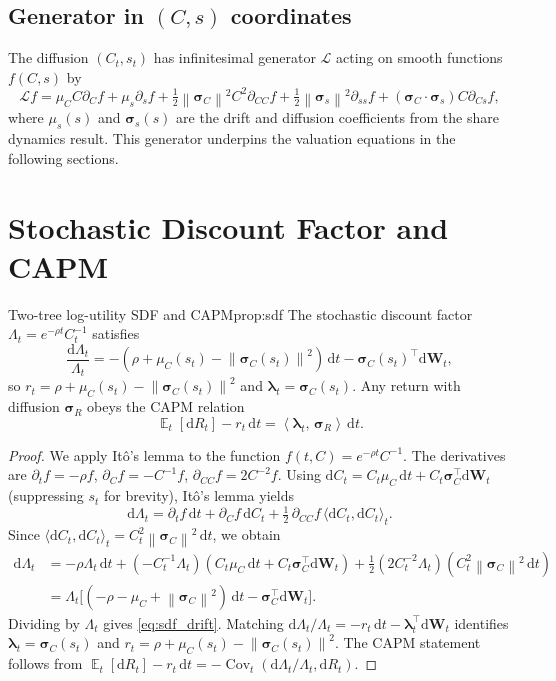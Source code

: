 ﻿\documentclass[11pt,letterpaper,oneside]{article}
\numberwithin{equation}{section}
\DeclareMathOperator{\E}{\mathbb{E}}
\DeclareMathOperator{\Cov}{\mathrm{Cov}}
\newcommand{\1}{\mathbf{1}}
\newcommand{\diff}{\mathrm{d}}
\newcommand{\norm}[1]{\left\lVert #1\right\rVert}
\newcommand{\ip}[2]{\left\langle #1,\,#2\right\rangle}
\begin{document}
\subsection{Generator in $(C,s)$ coordinates}
The diffusion $(C_t,s_t)$ has infinitesimal generator $\mathcal{L}$ acting on smooth functions $f(C,s)$ by
\[
  \mathcal{L}f = \mu_C C \partial_C f + \mu_s \partial_s f + \tfrac12 \norm{\bm{\sigma}_C}^2 C^2 \partial_{CC} f + \tfrac12 \norm{\bm{\sigma}_s}^2 \partial_{ss} f + (\bm{\sigma}_C\cdot\bm{\sigma}_s) C \partial_{Cs} f,
\]
where $\mu_s(s)$ and $\bm{\sigma}_s(s)$ are the drift and diffusion coefficients from the share dynamics result. This generator underpins the valuation equations in the following sections.

\section{Stochastic Discount Factor and CAPM}\label{sec:sdf}

\begin{proposition}{Two-tree log-utility SDF and CAPM}{prop:sdf}
The stochastic discount factor $\Lambda_t=e^{-\rho t}C_t^{-1}$ satisfies
\begin{equation}\label{eq:sdf_drift}
  \frac{\diff \Lambda_t}{\Lambda_t}=-(\rho+\mu_C(s_t)-\norm{\bm{\sigma}_C(s_t)}^2)\,\diff t-\bm{\sigma}_C(s_t)^{\top}\diff \bm{W}_t,
\end{equation}
so $r_t=\rho+\mu_C(s_t)-\norm{\bm{\sigma}_C(s_t)}^2$ and $\bm{\lambda}_t=\bm{\sigma}_C(s_t)$. Any return with diffusion $\bm{\sigma}_R$ obeys the CAPM relation
\begin{equation}\label{eq:capm}
  \E_t[\diff R_t]-r_t\,\diff t=\ip{\bm{\lambda}_t}{\bm{\sigma}_R}\,\diff t.
\end{equation}
\end{proposition}
\begin{proof}
We apply It\^o's lemma to the function $f(t, C) = e^{-\rho t} C^{-1}$. The derivatives are $\partial_t f = -\rho f$, $\partial_C f = -C^{-1} f$, $\partial_{CC} f = 2C^{-2} f$. Using $\diff C_t = C_t\mu_C\,\diff t + C_t\bm{\sigma}_C^{\top}\diff\bm{W}_t$ (suppressing $s_t$ for brevity), It\^o's lemma yields
\[
  \diff\Lambda_t = \partial_t f\,\diff t + \partial_C f\,\diff C_t + \tfrac12\,\partial_{CC} f\,\langle\diff C_t,\diff C_t\rangle_t.
\]
Since $\langle\diff C_t,\diff C_t\rangle_t = C_t^2\norm{\bm{\sigma}_C}^2\,\diff t$, we obtain
\begin{align*}
  \diff\Lambda_t
  &= -\rho\Lambda_t\,\diff t + (-C_t^{-1}\Lambda_t)(C_t\mu_C\,\diff t + C_t\bm{\sigma}_C^{\top}\diff\bm{W}_t) + \tfrac12(2 C_t^{-2}\Lambda_t)(C_t^2\norm{\bm{\sigma}_C}^2\,\diff t) \\
  &= \Lambda_t\Big[(-\rho-\mu_C+\norm{\bm{\sigma}_C}^2)\,\diff t - \bm{\sigma}_C^{\top}\diff\bm{W}_t\Big].
\end{align*}
Dividing by $\Lambda_t$ gives \cref{eq:sdf_drift}. Matching $\diff\Lambda_t/\Lambda_t = -r_t\,\diff t - \bm{\lambda}_t^{\top}\diff\bm{W}_t$ identifies $\bm{\lambda}_t=\bm{\sigma}_C(s_t)$ and $r_t=\rho+\mu_C(s_t)-\norm{\bm{\sigma}_C(s_t)}^2$. The CAPM statement follows from $\E_t[\diff R_t]-r_t\,\diff t=-\Cov_t(\diff\Lambda_t/\Lambda_t,\diff R_t)$.
\end{proof}
\end{document}
